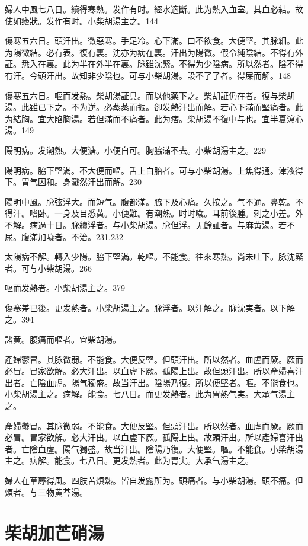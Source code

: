 婦人中風七八日。續得寒熱。发作有时。經水適斷。此为熱入血室。其血必結。故使如瘧狀。发作有时。小柴胡湯主之。144

傷寒五六日。頭汗出。微惡寒。手足冷。心下滿。口不欲食。大便堅。其脉細。此为陽微結。必有表。復有裏。沈亦为病在裏。汗出为陽微。假令純陰結。不得有外証。悉入在裏。此为半在外半在裏。脉雖沈緊。不得为少陰病。所以然者。陰不得有汗。今頭汗出。故知非少陰也。可与{\khaaitp 小}柴胡湯。設不了了者。得屎而解。148

傷寒五六日。嘔而发熱。柴胡湯証具。而以他藥下之。柴胡証仍在者。復与柴胡湯。此雖已下之。不为逆。必蒸蒸而振。卻发熱汗出而解。若心下滿而堅痛者。此为結胸。宜大陷胸湯。若但滿而不痛者。此为痞。柴胡{\khaaitp 湯}不復中与也。宜半夏瀉心湯。149

陽明病。发潮熱。大便溏。小便自可。胸脇滿不去。小柴胡湯主之。229

陽明病。脇下堅滿。不大便而嘔。舌上白胎者。可与小柴胡湯。上焦得通。津液得下。胃气因和。身濈然汗出而解。230

陽明中風。脉弦浮大。而短气。腹都滿。脇下及心痛。久按之。气不通。鼻乾。不得汗。嗜卧。一身及目悉黄。小便難。有潮熱。时时噦。耳前後腫。刺之小差。外不解。病過十日。脉續浮者。与{\khaaitp 小}柴胡湯。脉但浮。无餘証者。与麻黄湯。若不尿。腹滿加噦者。不治。231.232

太陽病不解。轉入少陽。脇下堅滿。乾嘔。不能食。往來寒熱。尚未吐下。脉沈緊者。可与小柴胡湯。266

嘔而发熱者。小柴胡湯主之。379

傷寒差已後。更发熱者。小柴胡湯主之。脉浮者。以汗解之。脉沈実者。以下解之。394

諸黄。腹痛而嘔者。宜柴胡湯。

產婦鬱{\khaaitp 冒}。其脉微弱。不能食。大便反堅。但頭汗出。所以然者。血虗而厥。厥而必冒。冒家欲解。必大汗出。以血虗下厥。孤陽上出。故但頭汗出。所以產婦喜汗出者。亡陰血虗。陽气獨盛。故当汗出。陰陽乃復。所以便堅者。嘔。不能食也。小柴胡湯主之。病解。能食。七八日。而更发熱者。此为胃熱气実。大承气湯主之。{\wuben}

產婦鬱冒。其脉微弱。不能食。大便反堅。但頭汗出。所以然者。血虗而厥。厥而必冒。冒家欲解。必大汗出。以血虗下厥。孤陽上出。故頭汗出。所以產婦喜汗出者。亡陰血虗。陽气獨盛。故当汗出。陰陽乃復。大便堅。嘔。不能食。小柴胡湯主之。病解。能食。七八日。更发熱者。此为胃実。大承气湯主之。{\dengben}

婦人在草蓐得風。四肢苦煩熱。皆自发露所为。頭痛者。与小柴胡湯。頭不痛。但煩者。与三物黄芩湯。

\section{柴胡加芒硝湯}

